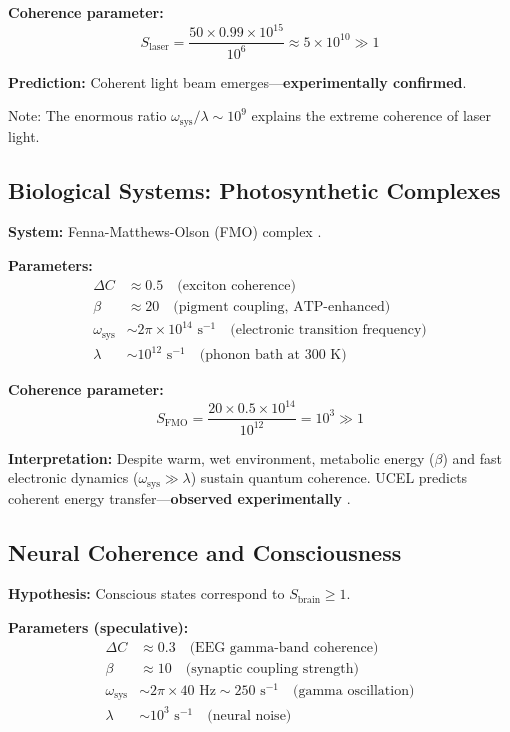 \documentclass[12pt,a4paper]{article}
\begin{document}
\textbf{Coherence parameter:}
\begin{equation}
S_{\text{laser}} = \frac{50 \times 0.99 \times 10^{15}}{10^6} \approx 5 \times 10^{10} \gg 1
\end{equation}

\textbf{Prediction:} Coherent light beam emerges---\textbf{experimentally confirmed}.

Note: The enormous ratio $\omega_{\text{sys}}/\lambda \sim 10^9$ explains the extreme coherence of laser light.

\subsection{Biological Systems: Photosynthetic Complexes}

\textbf{System:} Fenna-Matthews-Olson (FMO) complex \citep{engel2007}.

\textbf{Parameters:}
\begin{align}
\Delta C &\approx 0.5 \quad \text{(exciton coherence)} \\
\beta &\approx 20 \quad \text{(pigment coupling, ATP-enhanced)} \\
\omega_{\text{sys}} &\sim 2\pi \times 10^{14} \text{ s}^{-1} \quad \text{(electronic transition frequency)} \\
\lambda &\sim 10^{12} \text{ s}^{-1} \quad \text{(phonon bath at 300 K)}
\end{align}

\textbf{Coherence parameter:}
\begin{equation}
S_{\text{FMO}} = \frac{20 \times 0.5 \times 10^{14}}{10^{12}} = 10^3 \gg 1
\end{equation}

\textbf{Interpretation:} Despite warm, wet environment, metabolic energy ($\beta$) and fast electronic dynamics ($\omega_{\text{sys}} \gg \lambda$) sustain quantum coherence. UCEL predicts coherent energy transfer---\textbf{observed experimentally} \citep{engel2007}.

\subsection{Neural Coherence and Consciousness}

\textbf{Hypothesis:} Conscious states correspond to $S_{\text{brain}} \geq 1$.

\textbf{Parameters (speculative):}
\begin{align}
\Delta C &\approx 0.3 \quad \text{(EEG gamma-band coherence)} \\
\beta &\approx 10 \quad \text{(synaptic coupling strength)} \\
\omega_{\text{sys}} &\sim 2\pi \times 40 \text{ Hz} \sim 250 \text{ s}^{-1} \quad \text{(gamma oscillation)} \\
\lambda &\sim 10^3 \text{ s}^{-1} \quad \text{(neural noise)}
\end{align}
\end{document}
